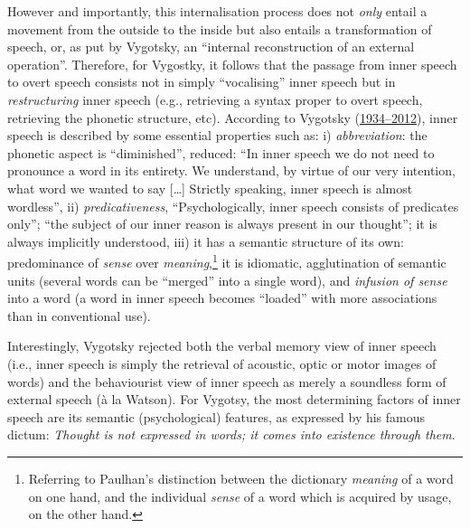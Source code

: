 \documentclass[a4paper,12pt,twoside,onecolumn,openright,final,oldfontcommands]{memoir}
\let\rmarkdownfootnote\footnote%
\def\footnote{\protect\rmarkdownfootnote}
\begin{document}
However and importantly, this internalisation process does not \emph{only} entail a movement from the outside to the inside but also entails a transformation of speech, or, as put by Vygotsky, an \enquote{internal reconstruction of an external operation}. Therefore, for Vygostky, it follows that the passage from inner speech to overt speech consists not in simply \enquote{vocalising} inner speech but in \emph{restructuring} inner speech (e.g., retrieving a syntax proper to overt speech, retrieving the phonetic structure, etc). According to Vygotsky (\protect\hyperlink{ref-vygotsky_thought_1934}{1934--2012}), inner speech is described by some essential properties such as: i) \emph{abbreviation}: the phonetic aspect is \enquote{diminished}, reduced: \enquote{In inner speech we do not need to pronounce a word in its entirety. We understand, by virtue of our very intention, what word we wanted to say {[}\ldots{]} Strictly speaking, inner speech is almost wordless}, ii) \emph{predicativeness}, \enquote{Psychologically, inner speech consists of predicates only}; \enquote{the subject of our inner reason is always present in our thought}; it is always implicitly understood, iii) it has a semantic structure of its own: predominance of \emph{sense} over \emph{meaning},\footnote{Referring to Paulhan's distinction between the dictionary \emph{meaning} of a word on one hand, and the individual \emph{sense} of a word which is acquired by usage, on the other hand.} it is idiomatic, agglutination of semantic units (several words can be \enquote{merged} into a single word), and \emph{infusion of sense} into a word (a word in inner speech becomes \enquote{loaded} with more associations than in conventional use).

Interestingly, Vygotsky rejected both the verbal memory view of inner speech (i.e., inner speech is simply the retrieval of acoustic, optic or motor images of words) and the behaviourist view of inner speech as merely a soundless form of external speech (à la Watson). For Vygotsy, the most determining factors of inner speech are its semantic (psychological) features, as expressed by his famous dictum: \emph{Thought is not expressed in words; it comes into existence through them}.
\end{document}
